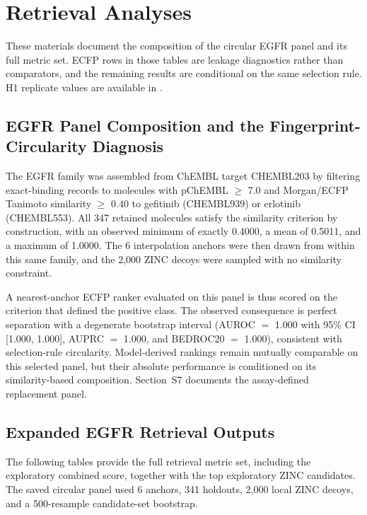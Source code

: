 \documentclass[11pt]{article}
\begin{document}
\section{Retrieval Analyses}
These materials document the composition of the circular EGFR panel and its full metric set. ECFP rows in those tables are leakage diagnostics rather than comparators, and the remaining results are conditional on the same selection rule. H1 replicate values are available in .

\subsection{EGFR Panel Composition and the Fingerprint-Circularity Diagnosis}
The EGFR family was assembled from ChEMBL target CHEMBL203 by filtering exact-binding records to molecules with pChEMBL $\geq$ 7.0 and Morgan/ECFP Tanimoto similarity $\geq$ 0.40 to gefitinib (CHEMBL939) or erlotinib (CHEMBL553). All 347 retained molecules satisfy the similarity criterion by construction, with an observed minimum of exactly 0.4000, a mean of 0.5011, and a maximum of 1.0000. The 6 interpolation anchors were then drawn from within this same family, and the 2,000 ZINC decoys were sampled with no similarity constraint.

A nearest-anchor ECFP ranker evaluated on this panel is thus scored on the criterion that defined the positive class. The observed consequence is perfect separation with a degenerate bootstrap interval (AUROC $=$ 1.000 with 95\% CI [1.000, 1.000], AUPRC $=$ 1.000, and BEDROC20 $=$ 1.000), consistent with selection-rule circularity. Model-derived rankings remain mutually comparable on this selected panel, but their absolute performance is conditioned on its similarity-based composition. Section~S7 documents the assay-defined replacement panel.

\subsection{Expanded EGFR Retrieval Outputs}
The following tables provide the full retrieval metric set, including the exploratory combined score, together with the top exploratory ZINC candidates. The saved circular panel used 6 anchors, 341 holdouts, 2,000 local ZINC decoys, and a 500-resample candidate-set bootstrap.
\end{document}
